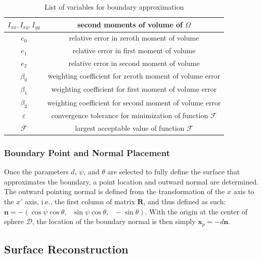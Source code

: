 \begin{table}[]
\begin{tabular}{|c||c|}
   $I_{xx}, I_{xy}, I_{yy}$ & second moments of volume of $\Omega$ \\ \hline
   $e_0$ & relative error in zeroth moment of volume \\ \hline
   $e_1$ & relative error in first moment of volume \\ \hline
   $e_2$ & relative error in second moment of volume \\ \hline   
   $\beta_0$ & weighting coefficient for zeroth moment of volume error \\ \hline
   $\beta_1$ & weighting coefficient for first moment of volume error \\ \hline
   $\beta_2$ & weighting coefficient for second moment of volume error \\ \hline 
   $\varepsilon$ & convergence tolerance for minimization of function $\mathcal{F}$ \\ \hline
   $\overline{\mathcal{F}}$ \rule{0mm}{4mm} & largest acceptable value of function $\mathcal{F}$ \\ \hline        
\end{tabular}
\caption{List of variables for boundary approximation}
\label{tab:surface}
\end{table}

\subsubsection{Boundary Point and Normal Placement}

Once the parameters $d$, $\psi$, and $\theta$ are selected to fully define the surface that approximates the boundary, a point location and outward normal are determined. The outward pointing normal is defined from the transformation of the $x$ axis to the $x'$ axis, i.e., the first column of matrix $\bm{R}$, and thus defined as such: $\bm{n} = -(\cos\psi\cos\theta,\text{\ }\sin\psi\cos\theta,\text{\ }-\sin\theta)$. With the origin at the center of sphere $\mathcal{D}$, the location of the boundary normal is then simply $\mathbf{x}_p = -d\bm{n}$.

\subsection{Surface Reconstruction}
\label{Surface Reconstruction}

